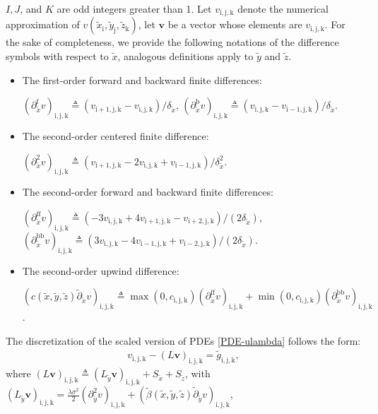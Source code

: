 \documentclass[12pt]{article}
\numberwithin{equation}{section}
\newcommand{\ri}{\mathrm{i}}
\newcommand{\rj}{\mathrm{j}}
\newcommand{\rk}{\mathrm{k}}
\begin{document}
$I,J$, and $K$ are odd integers greater than 1. 
Let $v_{\ri, \rj, \rk}$ denote the numerical approximation of $v(\tilde{x}_{\ri}, \tilde{y}_{\rj}, \tilde{z}_{\rk})$, 
let $\bm{v}$ be a vector whose elements are $v_{\ri, \rj, \rk}$.  
For the sake of completeness, 
we provide the following notations of the difference symbols with respect to $\tilde{x}$, 
analogous definitions apply to $\tilde{y}$ and $\tilde{z}$. 
\begin{itemize}
	\item The first-order forward and backward finite differences:
	
	$(\partial^{\mathrm{f}}_{\tilde{x}}v)_{\ri,\rj,\rk} \triangleq (v_{\ri+1, \rj, \rk} - v_{\ri, \rj, \rk})/\delta_{\tilde{x}}$, 
	$(\partial^{\mathrm{b}}_{\tilde{x}}v)_{\ri,\rj,\rk} \triangleq (v_{\ri, \rj, \rk} - v_{\ri-1, \rj, \rk})/\delta_{\tilde{x}}$. 
	\item  The second-order centered finite difference: 
	
	$(\partial^{2}_{\tilde{x}}v)_{\ri,\rj,\rk} \triangleq (v_{\ri+1, \rj, \rk} - 2v_{\ri, \rj, \rk} +  v_{\ri-1, \rj, \rk})/\delta^{2}_{\tilde{x}}$.  
	\item The second-order forward and backward finite differences: 
	
	$(\partial^{\mathrm{ff}}_{\tilde{x}}v)_{\ri,\rj,\rk} \triangleq (-3v_{\ri, \rj, \rk} + 4v_{\ri+1, \rj, \rk} - v_{\ri+2, \rj, \rk})/(2\delta_{\tilde{x}})$, 
	$(\partial^{\mathrm{bb}}_{\tilde{x}}v)_{\ri,\rj,\rk} \triangleq (3v_{\ri, \rj, \rk} - 4v_{\ri-1, \rj, \rk} + v_{\ri-2, \rj, \rk})/(2\delta_{\tilde{x}})$. 
	\item The second-order upwind difference: 
	
	$(c(\tilde{x},\tilde{y},\tilde{z})\tilde{\partial}_{\tilde{x}}v)_{\ri,\rj,\rk} 
	\triangleq \max(0,c_{\ri,\rj,\rk})(\partial^{\mathrm{ff}}_{\tilde{x}}v)_{\ri,\rj,\rk}
	+ \min(0,c_{\ri,\rj,\rk})(\partial^{\mathrm{bb}}_{\tilde{x}}v)_{\ri,\rj,\rk}$. 
\end{itemize} 
The discretization of the scaled version of PDEs \eqref{PDE-ulambda} follows the form: 
\begin{align}
	v_{\ri,\rj,\rk}  - (L\bm{v})_{\ri,\rj,\rk} = \tilde{g}_{\ri,\rj,\rk}, \label{Disc-01} 
\end{align}
where 
$(L\bm{v})_{\ri,\rj,\rk} \triangleq (L_{\tilde{y}}\bm{v})_{\ri,\rj,\rk} + S_{\tilde{x}}
+S_{\tilde{z}}$,  
with $(L_{\tilde{y}}\bm{v})_{\ri,\rj,\rk} = \frac{\lambda\sigma^{2}}{2}(\partial^{2}_{\tilde{y}}v)_{\ri,\rj,\rk}
+ (\tilde{\beta}(\tilde{x},\tilde{y},\tilde{z})\tilde{\partial}_{\tilde{y}}v)_{\ri,\rj,\rk}$, 
\end{document}
